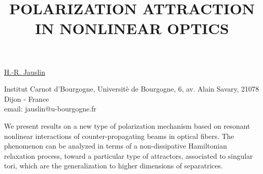 \title{POLARIZATION ATTRACTION IN NONLINEAR OPTICS}

\underline{H.-R. Jauslin}


Institut Carnot d'Bourgogne,
Universit\`e de Bourgogne,
6, av. Alain Savary,
21078 Dijon - France\\
email: jauslin@u-bourgogne.fr

We present results on a new type of polarization mechanism based on resonant nonlinear interactions of counter-propagating
beams in optical fibers.
The phenomenon can be analyzed in terms of a non-dissipative Hamiltonian relaxation process, toward a particular type of
attractors,  associated to singular tori, which are the generalization to higher dimensions of separatrices.

\vspace{\baselineskip}